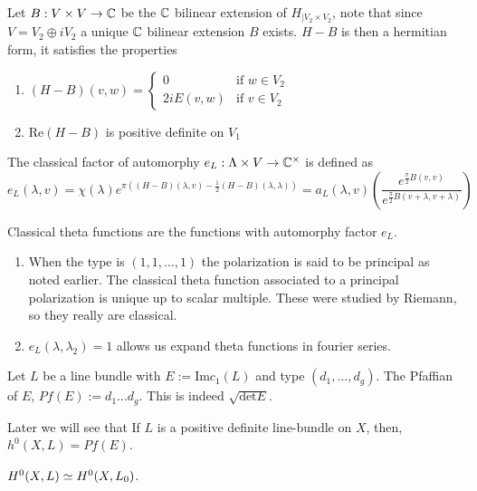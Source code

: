 \begin{paragraph}
{}Let $B:V\times V\rightarrow {\mathbb C}$ be the ${\mathbb C}$ bilinear extension of $H_{\mid V_2\times V_2}$, note that since $V=V_2\oplus i V_2$ a unique ${\mathbb C}$ bilinear extension $B$ exists. $H-B$ is then a hermitian form, it satisfies the properties 
\begin{enumerate}
\item $(H-B)(v,w)=\begin{cases}
0 &\mbox{if } w\in V_2\\
2i E(v,w) &\mbox{if } v\in V_2
\end{cases}$
\item $\text{Re}(H-B)$ is positive definite on $V_1$
\end{enumerate}
\begin{definition}
The classical factor of automorphy $e_L:\Lambda\times V\rightarrow {\mathbb C}^{\times}$ is defined as
\begin{equation*}
e_L(\lambda, v)=\chi(\lambda) e^{\pi((H-B)(\lambda,v)-\frac{1}{2} (H-B)(\lambda, \lambda))}=a_L(\lambda,v) (\frac{e^{\frac{\pi}{2} B(v,v)}}{e^{\frac{\pi}{2} B(v+\lambda,v+\lambda)}})
\end{equation*}
\end{definition}
\begin{definition}
Classical theta functions are the functions with automorphy factor $e_L$.
\end{definition}
\begin{enumerate}
\item When the type is $(1,1,\dots, 1)$ the polarization is said to be principal as noted earlier. The classical theta function associated to a principal polarization is unique up to scalar multiple. These were studied by Riemann, so they really are classical.
\item $e_L(\lambda, \lambda_2)=1$ allows us expand theta functions in fourier series.
\end{enumerate}
\begin{definition}
Let $L$ be a line bundle with $E:=\text{Im} c_1(L)$ and type $(d_1,\dots, d_g)$. The Pfaffian of $E$, $Pf(E):=d_1\dots d_g$. This is indeed $\sqrt{\text{det} E}$.
\end{definition}
\end{paragraph}

Later we will see that 
If $L$ is a positive definite line-bundle on $X$, then, $h^0(X,L)=Pf(E)$.


\begin{lemma}
$H^0(X,L)\simeq H^0(X,L_0)$.
\end{lemma}

